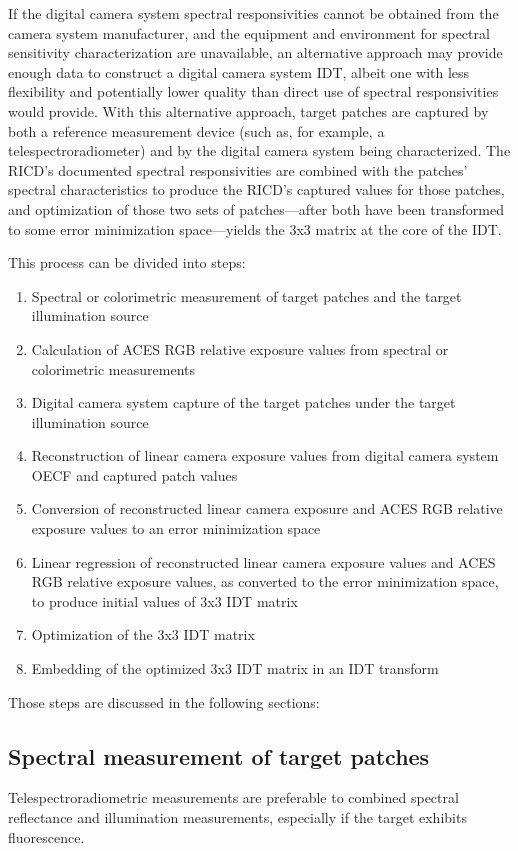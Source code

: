 
If the digital camera system spectral responsivities cannot be obtained from the camera system manufacturer, and the equipment and environment for spectral sensitivity characterization are unavailable, an alternative approach may provide enough data to construct a digital camera system IDT, albeit one with less flexibility and potentially lower quality than direct use of spectral responsivities would provide. With this alternative approach, target patches are captured by both a reference measurement device (such as, for example, a telespectroradiometer) and by the digital camera system being characterized. The RICD's documented spectral responsivities are combined with the patches' spectral characteristics to produce the RICD's captured values for those patches, and optimization of those two sets of patches—after both have been transformed to some error minimization space—yields the 3x3 matrix at the core of the IDT.


This process can be divided into steps:
\begin{enumerate}
	\item Spectral or colorimetric measurement of target patches and the target illumination source
	\item Calculation of ACES RGB relative exposure values from spectral or colorimetric measurements
	\item Digital camera system capture of the target patches under the target illumination source
	\item Reconstruction of linear camera exposure values from digital camera system OECF and captured patch values
	\item Conversion of reconstructed linear camera exposure and ACES RGB relative exposure values to an error minimization space
	\item Linear regression of reconstructed linear camera exposure values and ACES RGB relative exposure values, as converted to the error minimization space, to produce initial values of 3x3 IDT matrix 
	\item Optimization of the 3x3 IDT matrix
	\item Embedding of the optimized 3x3 IDT matrix in an IDT transform	
\end{enumerate}


Those steps are discussed in the following sections:

\subsection*{Spectral measurement of target patches}
Telespectroradiometric measurements are preferable to combined spectral reflectance and illumination measurements, especially if the target exhibits fluorescence.



